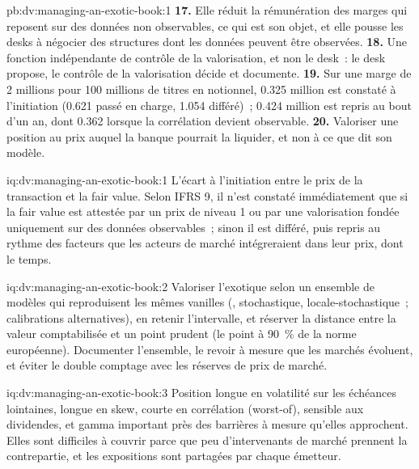 \begin{solution}{pb:dv:managing-an-exotic-book:1}
\textbf{17.} Elle réduit la rémunération des marges qui reposent sur des données non observables, ce qui est son objet, et elle pousse les desks à négocier des structures dont les données peuvent être observées.
\textbf{18.} Une fonction indépendante de contrôle de la valorisation, et non le desk~: le desk propose, le contrôle de la valorisation décide et documente.
\textbf{19.} Sur une marge de 2 millions pour 100 millions de titres en notionnel, 0.325 million est constaté à l'initiation (0.621 passé en charge, 1.054 différé)~; 0.424 million est repris au bout d'un an,
dont 0.362 lorsque la corrélation devient observable.
\textbf{20.} Valoriser une position au prix auquel la banque pourrait la liquider, et non à ce que dit son modèle.
\end{solution}

\begin{solution}{iq:dv:managing-an-exotic-book:1}
L'écart à l'initiation entre le prix de la transaction et la fair value. Selon IFRS 9, il n'est constaté immédiatement que si la fair value est attestée par un prix de niveau 1 ou
par une valorisation fondée uniquement sur des données observables~; sinon il est différé, puis repris au rythme des facteurs que les acteurs de marché intégreraient dans leur prix, dont le temps.
\end{solution}

\begin{solution}{iq:dv:managing-an-exotic-book:2}
Valoriser l'exotique selon un ensemble de modèles qui reproduisent les mêmes vanilles (, stochastique, locale-stochastique~; calibrations alternatives), en retenir l'intervalle, et réserver la
distance entre la valeur comptabilisée et un point prudent (le point à 90~\% de la norme européenne). Documenter l'ensemble, le revoir à mesure que les marchés évoluent, et éviter le double comptage avec les
réserves de prix de marché.
\end{solution}

\begin{solution}{iq:dv:managing-an-exotic-book:3}
Position longue en volatilité sur les échéances lointaines, longue en skew, courte en corrélation (worst-of), sensible aux dividendes, et gamma important près des barrières à mesure qu'elles approchent. Elles sont difficiles à couvrir parce que peu
d'intervenants de marché prennent la contrepartie, et les expositions sont partagées par chaque émetteur.
\end{solution}

